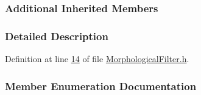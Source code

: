 \subsubsection*{Additional Inherited Members}


\subsubsection{Detailed Description}


Definition at line \hyperlink{_morphological_filter_8h_source_l00014}{14} of file \hyperlink{_morphological_filter_8h_source}{Morphological\+Filter.\+h}.



\subsubsection{Member Enumeration Documentation}
\hypertarget{class_vision_1_1_morphological_filter_a1f19c9cb13f0d68778c77d6fd0370868}{}
